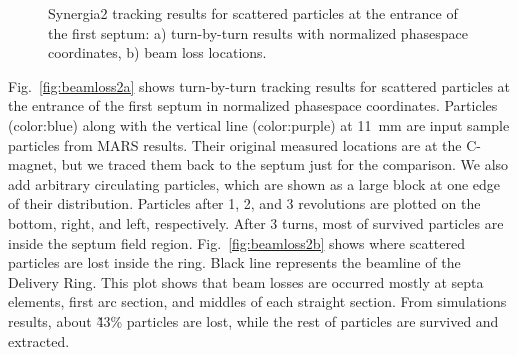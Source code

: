 \documentclass[aps,prstab,onecolumn,preprint]{revtex4-1}
\begin{document}
\begin{figure}[!tbp]
  \caption{\label{fig:beamloss2}Synergia2 tracking results for scattered particles at the entrance of the first septum: a) turn-by-turn results with normalized phasespace coordinates, b) beam loss locations.}
\end{figure}

Fig.~\ref{fig:beamloss2a} shows turn-by-turn tracking results for scattered particles at the entrance of the first septum in normalized phasespace coordinates. Particles (color:blue) along with the vertical line (color:purple) at 11~mm are input sample particles from MARS results. Their original measured locations are at the C-magnet, but we traced them back to the septum just for the comparison. We also add arbitrary circulating particles, which are shown as a large block at one edge of their distribution. Particles after 1, 2, and 3 revolutions are plotted on the bottom, right, and left, respectively. After 3 turns, most of survived particles are inside the septum field region. Fig.~\ref{fig:beamloss2b} shows where scattered particles are lost inside the ring. Black line represents the beamline of the Delivery Ring. This plot shows that beam losses are occurred mostly at septa elements, first arc section, and middles of each straight section. From simulations results, about \~43\% particles are lost, while the rest of particles are survived and extracted. 
\end{document}
